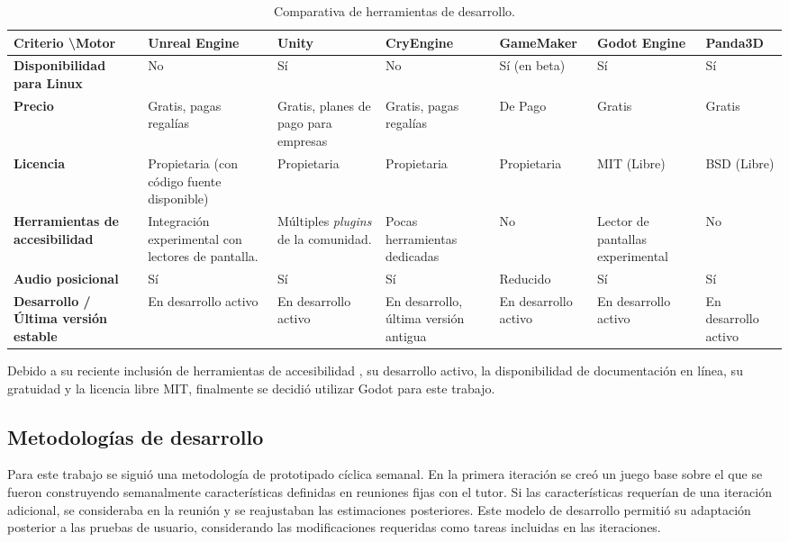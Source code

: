 \begin{center}
	\begin{table}[h]
		\centering
		\caption{Comparativa de herramientas de desarrollo.}
		\label{table:comp-engines}
		\begin{adjustbox}{max width=\textwidth}
			\begin{NiceTabular}{ |>{\centering\arraybackslash}m{3.3cm}||>{\centering\arraybackslash}m{3cm}|>{\centering\arraybackslash}m{3cm}|>{\centering\arraybackslash}m{3cm}|>{\centering\arraybackslash}m{3cm}|>{\centering\arraybackslash}m{3cm}|>{\centering\arraybackslash}m{3cm}|  }
				
				\midrule
				\textbf{Criterio} \textbackslash \textbf{Motor} & \textbf{Unreal Engine} & \textbf{Unity} & \textbf{CryEngine} & \textbf{GameMaker} & \textbf{Godot Engine} & \textbf{Panda3D}\\
				\midrule[1pt]
				\textbf{Disponibilidad para Linux} & No & Sí  &  No & Sí (en beta) & Sí & Sí \\
				\midrule
				\textbf{Precio} & Gratis, pagas regalías & Gratis, planes de pago para empresas &  Gratis, pagas regalías & De Pago & Gratis & Gratis \\
				\midrule
				\textbf{Licencia} & Propietaria (con código fuente disponible) & Propietaria  &  Propietaria & Propietaria & MIT (Libre) & BSD (Libre) \\
				\midrule
				\textbf{Herramientas de accesibilidad} & Integración experimental con lectores de pantalla. & Múltiples \textit{plugins} de la comunidad.  &  Pocas herramientas dedicadas & No & Lector de pantallas experimental & No \\
				\midrule
				\textbf{Audio posicional} & Sí & Sí  &  Sí & Reducido & Sí & Sí \\
				\midrule
				\textbf{Desarrollo / Última versión estable} & En desarrollo activo & En desarrollo activo  &  En desarrollo, última versión antigua  & En desarrollo activo & En desarrollo activo & En desarrollo activo \\
				\midrule
			\end{NiceTabular}
		\end{adjustbox}
	\end{table}
\end{center}
Debido a su reciente inclusión de herramientas de accesibilidad \cite{engine_dev_nodate}, su desarrollo activo, la disponibilidad de documentación en línea, su gratuidad y la licencia libre MIT, finalmente se decidió utilizar Godot para este trabajo.
\subsection{Metodologías de desarrollo}
Para este trabajo se siguió una metodología de prototipado cíclica semanal. En la primera iteración se creó un juego base sobre el que se fueron construyendo semanalmente características definidas en reuniones fijas con el tutor. Si las características requerían de una iteración adicional, se consideraba en la reunión y se reajustaban las estimaciones posteriores. Este modelo de desarrollo permitió su adaptación posterior a las pruebas de usuario, considerando las modificaciones requeridas como tareas incluidas en las iteraciones.
